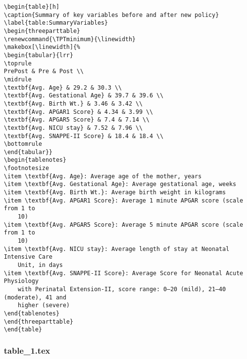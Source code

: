 \documentclass[11pt]{article}
\begin{document}
\begin{Verbatim}[tabsize=4]
\begin{table}[h]
\caption{Summary of key variables before and after new policy}
\label{table:SummaryVariables}
\begin{threeparttable}
\renewcommand{\TPTminimum}{\linewidth}
\makebox[\linewidth]{%
\begin{tabular}{lrr}
\toprule
PrePost & Pre & Post \\
\midrule
\textbf{Avg. Age} & 29.2 & 30.3 \\
\textbf{Avg. Gestational Age} & 39.7 & 39.6 \\
\textbf{Avg. Birth Wt.} & 3.46 & 3.42 \\
\textbf{Avg. APGAR1 Score} & 4.34 & 3.99 \\
\textbf{Avg. APGAR5 Score} & 7.4 & 7.14 \\
\textbf{Avg. NICU stay} & 7.52 & 7.96 \\
\textbf{Avg. SNAPPE-II Score} & 18.4 & 18.4 \\
\bottomrule
\end{tabular}}
\begin{tablenotes}
\footnotesize
\item \textbf{Avg. Age}: Average age of the mother, years
\item \textbf{Avg. Gestational Age}: Average gestational age, weeks
\item \textbf{Avg. Birth Wt.}: Average birth weight in kilograms
\item \textbf{Avg. APGAR1 Score}: Average 1 minute APGAR score (scale from 1 to
	10)
\item \textbf{Avg. APGAR5 Score}: Average 5 minute APGAR score (scale from 1 to
	10)
\item \textbf{Avg. NICU stay}: Average length of stay at Neonatal Intensive Care
	Unit, in days
\item \textbf{Avg. SNAPPE-II Score}: Average Score for Neonatal Acute Physiology
	with Perinatal Extension-II, score range: 0–20 (mild), 21–40 (moderate), 41 and
	higher (severe)
\end{tablenotes}
\end{threeparttable}
\end{table}

\end{Verbatim}

\subsubsection*{table\_1.tex}
\end{document}
